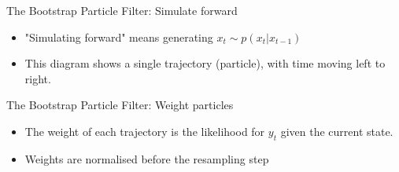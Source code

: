 \documentclass[pdf]
{beamer}
\begin{document}
\begin{frame}{The Bootstrap Particle Filter: Simulate forward}
	\begin{itemize}
		\item "Simulating forward" means generating $x_t \sim p(x_t | x_{t - 1})$
	    \item This diagram shows a single trajectory (particle), with time moving left to right.
    \end{itemize}
	
	\vspace{5mm}
	

\end{frame}



\begin{frame}{The Bootstrap Particle Filter: Weight particles}
	\begin{itemize}
		\item The weight of each trajectory is the likelihood for $y_t$ given the current state.
		\item Weights are normalised before the resampling step
	\end{itemize}
	
	\vspace{5mm}
\end{frame}
\end{document}
